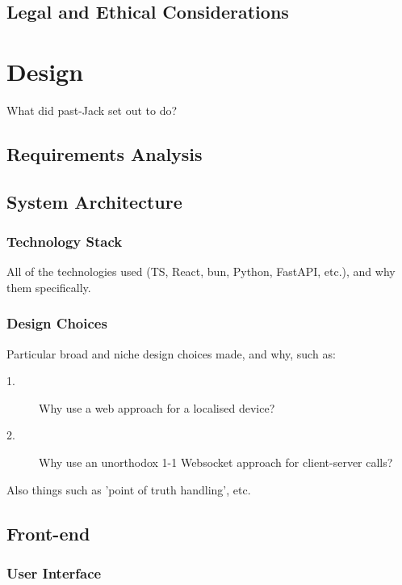     \subsection{Legal and Ethical Considerations}


\section{Design} %
    What did past-Jack set out to do?

    \subsection{Requirements Analysis}

    \subsection{System Architecture} %
        \subsubsection{Technology Stack}
            All of the technologies used (TS, React, bun, Python, FastAPI, etc.), and why them specifically.

        \subsubsection{Design Choices}
            Particular broad and niche design choices made, and why, such as:
            \begin{description}
                \item[1.] Why use a web approach for a localised device?
                \item[2.] Why use an unorthodox 1-1 Websocket approach for client-server calls?
            \end{description}
            Also things such as 'point of truth handling', etc.

    \subsection{Front-end}
        \subsubsection{User Interface}

